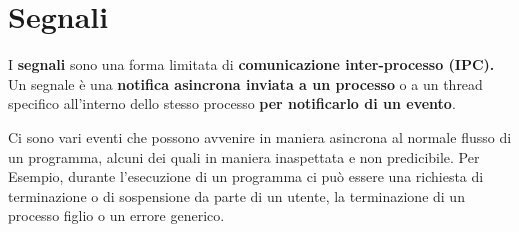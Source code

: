 \section{Segnali}

I \textbf{segnali} sono una forma limitata di \textbf{comunicazione inter-processo (IPC).} Un segnale è una \textbf{notifica asincrona inviata a un processo} o a un thread specifico all'interno dello stesso processo \textbf{per notificarlo di un evento}.

Ci sono vari eventi che possono avvenire in maniera asincrona al normale flusso di un programma, alcuni dei quali in maniera inaspettata e non predicibile. Per Esempio, durante l'esecuzione di un programma ci può essere una richiesta di terminazione o di sospensione da parte di un utente, la terminazione di un processo figlio o un errore generico.

